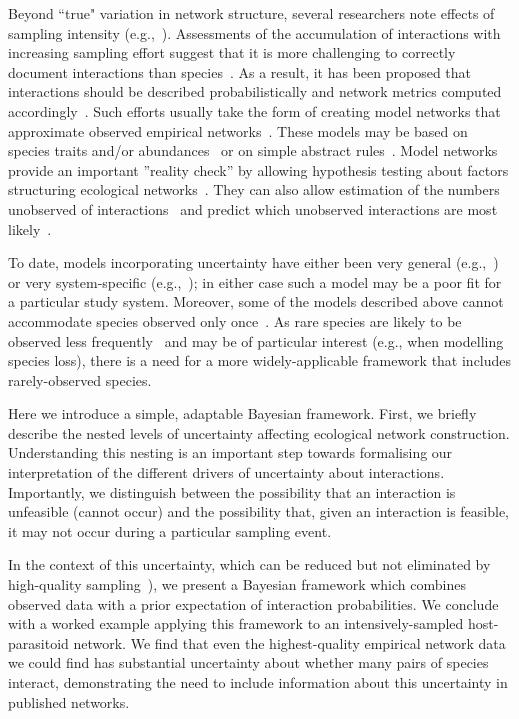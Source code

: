 \documentclass[12pt]{article}
\begin{document}
\begin{spacing}{2.0}
    Beyond ``true" variation in network structure, several researchers note effects of sampling intensity (e.g.,~\citealp{Martinez1999,Bluthgen2006,Jordano2016}). Assessments of the accumulation of interactions with increasing sampling effort suggest that it is more challenging to correctly document interactions than species~\citep{Guimera2009,Poisot2012,Bartomeus2013,Jordano2016,Giron2018}. As a result, it has been proposed that interactions should be described probabilistically and network metrics computed accordingly~\citep{Bartomeus2013,Poisot2016}. Such efforts usually take the form of creating model networks that approximate observed empirical networks~\citep{Allesina2008,Guimera2009,Williams2010,Rohr2016}. These models may be based on species traits and/or abundances~\citep{Rohr2016,Weinstein2017a,Graham2018} or on simple abstract rules~\citep{Allesina2008,Guimera2009,Williams2010}. Model networks provide an important ''reality check'' by allowing hypothesis testing about factors structuring ecological networks~\citep{Bartomeus2013,Graham2018}. They can also allow estimation of the numbers unobserved of interactions~\citep{Jordano2016,Weinstein2017a} and predict which unobserved interactions are most likely~\citep{Guimera2009,Bartomeus2013}. 


    To date, models incorporating uncertainty have either been very general (e.g.,~\citet{Guimera2009,Gravel2018}) or very system-specific (e.g.,~\citet{Bartomeus2013,Graham2018}); in either case such a model may be a poor fit for a particular study system. Moreover, some of the models described above cannot accommodate species observed only once~\citep{Bartomeus2013,Weinstein2017}. As rare species are likely to be observed less frequently~\citep{Bluthgen2006} and may be of particular interest (e.g., when modelling species loss), there is a need for a more widely-applicable framework that includes rarely-observed species. 


    Here we introduce a simple, adaptable Bayesian framework. First, we briefly describe the nested levels of uncertainty affecting ecological network construction. Understanding this nesting is an important step towards formalising our interpretation of the different drivers of uncertainty about interactions. Importantly, we distinguish between the possibility that an interaction is unfeasible (cannot occur) and the possibility that, given an interaction is feasible, it may not occur during a particular sampling event. 


    In the context of this uncertainty, which can be reduced but not eliminated by high-quality sampling~\citep{Bartomeus2013}), we present a Bayesian framework which combines observed data with a prior expectation of interaction probabilities. We conclude with a worked example applying this framework to an intensively-sampled host-parasitoid network. We find that even the highest-quality empirical network data we could find has substantial uncertainty about whether many pairs of species interact, demonstrating the need to include information about this uncertainty in published networks. 



\end{spacing}
\end{document}
